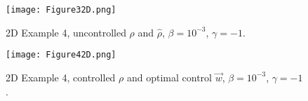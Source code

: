 
\begin{figure}[h]
	\texttt{[image: Figure32D.png]}
	\caption{2D Example 4, uncontrolled $\rho$ and $\widehat \rho$, $\beta = 10^{-3}$, $\gamma = -1$. }
	\label{rhoHat2dEx4}
\end{figure}
\begin{figure}[h]
	\texttt{[image: Figure42D.png]}
	\caption{2D Example 4, controlled $\rho$ and optimal control $\vec{w}$, $\beta = 10^{-3}$, $\gamma = -1$.}
	\label{rhoOpt2dEx4}
\end{figure}







